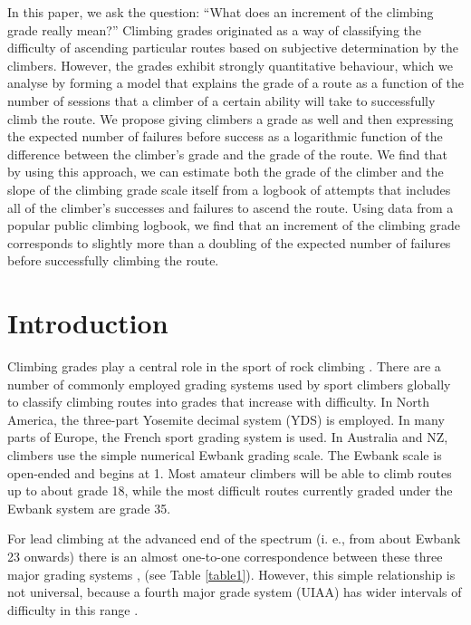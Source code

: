 \documentclass{article}
\begin{document}
In this paper, we ask the question: ``What does an increment of the climbing grade really mean?''  Climbing grades originated as a way of classifying the difficulty of ascending particular routes based on subjective determination by the climbers.  However, the grades exhibit strongly quantitative behaviour, which we analyse by forming a model that explains the grade of a route as a function of the number of sessions that a climber of a certain ability will take to successfully climb the route. We propose giving climbers a grade as well and then expressing the expected number of failures before success as a logarithmic function of the difference between the climber's grade and the grade of the route.  We find that by using this approach, we can estimate both the grade of the climber and the slope of the climbing grade scale itself from a logbook of attempts that includes all of the climber's successes and failures to ascend the route.  Using data from a popular public climbing logbook, we find that an increment of the climbing grade corresponds to slightly more than a doubling of the expected number of failures before successfully climbing the route.

\section*{Introduction}

Climbing grades play a central role in the sport of rock climbing \cite{delignieres1993psychophysical,draper2015comparative}. There are a number of commonly employed grading systems used by sport climbers globally to classify climbing routes into grades that increase with difficulty.  In North America, the three-part Yosemite decimal system (YDS) is employed.  In many parts of Europe, the French sport grading system is used.  In Australia and NZ, climbers use the simple numerical Ewbank grading scale. The Ewbank scale is open-ended and begins at 1. Most amateur climbers will be able to climb routes up to about grade 18, while the most difficult routes currently graded under the Ewbank system are grade 35. 

For lead climbing at the advanced end of the spectrum (i. e., from about Ewbank 23 onwards) there is an almost one-to-one correspondence between these three major grading systems \cite{draper2015comparative}, (see Table \ref{table1}).  However, this simple relationship is not universal, because a fourth major grade system (UIAA) has wider intervals of difficulty in this range \cite{draper2015comparative}.
\end{document}

